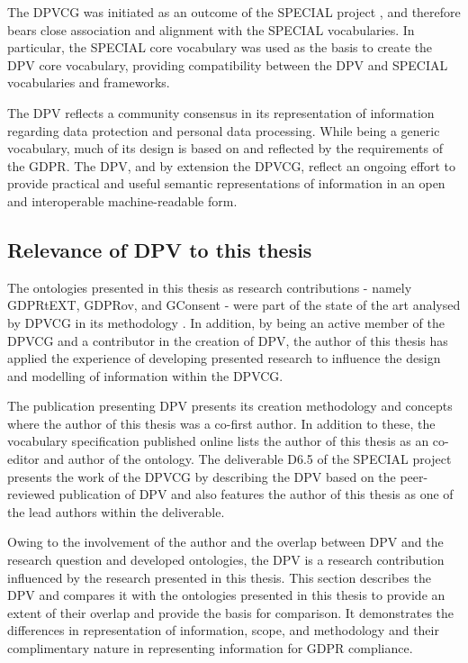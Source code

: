 The DPVCG was initiated as an outcome of the SPECIAL project \cite{pandit_d6.5_2019}, and therefore bears close association and alignment with the SPECIAL vocabularies.
In particular, the SPECIAL core vocabulary was used as the basis to create the DPV core vocabulary, providing compatibility between the DPV and SPECIAL vocabularies and frameworks.

The DPV reflects a community consensus in its representation of information regarding data protection and personal data processing. While being a generic vocabulary, much of its design is based on and reflected by the requirements of the GDPR. The DPV, and by extension the DPVCG, reflect an ongoing effort to provide practical and useful semantic representations of information in an open and interoperable machine-readable form. 

\subsection{Relevance of DPV to this thesis}
The ontologies presented in this thesis as research contributions - namely GDPRtEXT, GDPRov, and GConsent - were part of the state of the art analysed by DPVCG in its methodology \cite{pandit_creating_2019}.
In addition, by being an active member of the DPVCG and a contributor in the creation of DPV, the author of this thesis has applied the experience of developing presented research to influence the design and modelling of information within the DPVCG.

The publication presenting DPV \cite{pandit_creating_2019} presents its creation methodology and concepts where the author of this thesis was a co-first author.
In addition to these, the vocabulary specification published online lists the author of this thesis as an co-editor and author of the ontology.
The deliverable D6.5 \cite{pandit_d6.5_2019} of the SPECIAL project presents the work of the DPVCG by describing the DPV based on the peer-reviewed publication of DPV \cite{pandit_creating_2019} and also features the author of this thesis as one of the lead authors within the deliverable.

Owing to the involvement of the author and the overlap between DPV and the research question and developed ontologies, the DPV is a research contribution influenced by the research presented in this thesis.
This section describes the DPV and compares it with the ontologies presented in this thesis to provide an extent of their overlap and provide the basis for comparison.
It demonstrates the differences in representation of information, scope, and methodology and their complimentary nature in representing information for GDPR compliance.

